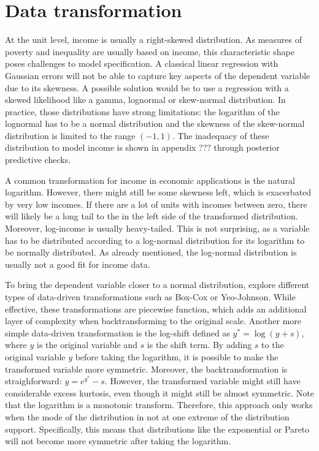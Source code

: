 \section{Data transformation}

At the unit level, income is usually a right-skewed distribution.
As measures of poverty and inequality are usually based on income, this characteristic shape poses challenges to model specification.
A classical linear regression with Gaussian errors will not be able to capture key aspects of the dependent variable due to its skewness.
A possible solution would be to use a regression with a skewed likelihood like a gamma, lognormal or skew-normal distribution.
In practice, those distributions have strong limitations: the logarithm of the lognormal has to be a normal distribution and the skewness of the skew-normal distribution is limited to the range $(-1, 1)$.
The inadequacy of these distribution to model income is shown in appendix ??? through posterior predictive checks.

A common transformation for income in economic applications is the natural logarithm. However, there might still be some skewness left, which is exacerbated by very low incomes.
If there are a lot of units with incomes between zero, there will likely be a long tail to the in the left side of the transformed distribution.
Moreover, log-income is usually heavy-tailed.
This is not surprising, as a variable has to be distributed according to a log-normal distribution for its logarithm to be normally distributed.
As already mentioned, the log-normal distribution is usually not a good fit for income data.

To bring the dependent variable closer to a normal distribution, \cite{rojas_perilla_data_2020} explore different types of data-driven transformations such as Box-Cox or Yeo-Johnson.
While effective, these transformations are piecewise function, which adds an additional layer of complexity when backtransforming to the original scale.
Another more simple data-driven transformation is the log-shift defined as $y^* = \log(y + s)$, where $y$ is the original variable and $s$ is the shift term.
By adding $s$ to the original variable $y$ before taking the logarithm, it is possible to make the transformed variable more symmetric.
Moreover, the backtransformation is straighforward: $y = e^{y^*} - s$.
However, the transformed variable might still have considerable excess kurtosis, even though it might still be almost symmetric.
Note that the logarithm is a monotonic transform.
Therefore, this approach only works when the mode of the distribution in not at one extreme of the distribution support.
Specifically, this means that distributions like the exponential or Pareto will not become more symmetric after taking the logarithm.

